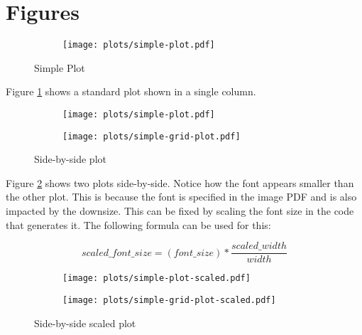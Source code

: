 \documentclass[12pt,twocolumn]{article}
\begin{document}


\section{Figures}

\begin{figure}[h]
    \centering
    \begin{subfigure}[b]{0.48\textwidth}
        \centering
        \texttt{[image: plots/simple-plot.pdf]}
    \end{subfigure}
    \caption{Simple Plot}
    \label{fig:simple-plot}
\end{figure}


Figure \ref{fig:simple-plot} shows a standard plot shown in a single column.


\begin{figure}[h]
    \centering
    \begin{subfigure}[b]{0.24\textwidth}
        \centering
        \texttt{[image: plots/simple-plot.pdf]}
    \end{subfigure}
    \begin{subfigure}[b]{0.24\textwidth}
        \centering
        \texttt{[image: plots/simple-grid-plot.pdf]}
    \end{subfigure}
    \caption{Side-by-side plot}
    \label{fig:side-by-side-plot}
\end{figure}

Figure \ref{fig:side-by-side-plot} shows two plots side-by-side.
%
Notice how the font appears smaller than the other plot.
%
This is because the font is specified in the image PDF and is also impacted by the downsize.
%
This can be fixed by scaling the font size in the code that generates it.
%
The following formula can be used for this:

\begin{equation}
    scaled\_font\_size = (font\_size) * \frac{scaled\_width}{width}
\end{equation}


\begin{figure}
    \centering
    \begin{subfigure}[b]{0.24\textwidth}
        \centering
        \texttt{[image: plots/simple-plot-scaled.pdf]}
    \end{subfigure}
    \begin{subfigure}[b]{0.24\textwidth}
        \centering
        \texttt{[image: plots/simple-grid-plot-scaled.pdf]}
    \end{subfigure}
    \caption{Side-by-side scaled plot}
    \label{fig:side-by-side-scaled-plot}
\end{figure}
\end{document}
